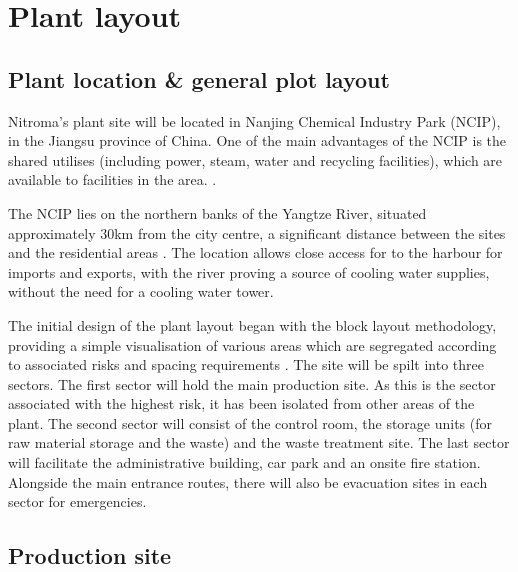\section{Plant layout}

\subsection{Plant location \& general plot layout}

Nitroma’s plant site will be located in Nanjing Chemical Industry Park (NCIP), in the Jiangsu province of China. One of the main advantages of the NCIP is the shared utilises (including power, steam, water and recycling facilities), which are available to facilities in the area. \cite{independent_commodity_intelligence_services_china_2007}.

The NCIP lies on the northern banks of the Yangtze River, situated approximately 30km from the city centre, a significant distance between the sites and the residential areas \cite{zeng_divergent_2011}. The location allows close access for to the harbour for imports and exports, with the river proving a source of cooling water supplies, without the need for a cooling water tower.    


The initial design of the plant layout began with the block layout methodology, providing a simple visualisation of various areas which are segregated according to associated risks and spacing requirements \cite{center_for_chemical_process_safety_site_2010}. The site will be spilt into three sectors. The first sector will hold the main production site. As this is the sector associated with the highest risk, it has been isolated from other areas of the plant. The second sector will consist of the control room, the storage units (for raw material storage and the waste) and the waste treatment site. The last sector will facilitate the administrative building, car park and an onsite fire station. Alongside the main entrance routes, there will also be evacuation sites in each sector for emergencies. 




\subsection{Production site}

